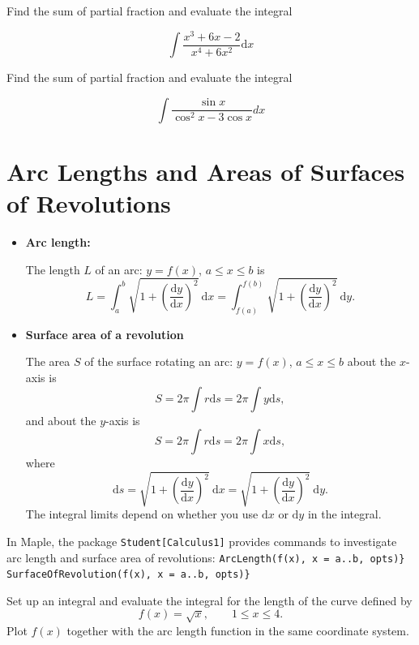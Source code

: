 \documentclass[]{book}
\theoremstyle{definition}
\theoremstyle{definition}
\theoremstyle{definition}
\theoremstyle{remark}
\let\BeginKnitrBlock\begin \let\EndKnitrBlock\end
\begin{document}
\BeginKnitrBlock{exercise}
\protect\hypertarget{exr:unnamed-chunk-5}{}{\label{exr:unnamed-chunk-5} }
Find the sum of partial fraction and evaluate the integral

\[
\int \frac{x^{3}+6 x-2}{x^{4}+6 x^{2}} \mathrm{d} x
\]
\EndKnitrBlock{exercise}

\BeginKnitrBlock{exercise}
\protect\hypertarget{exr:unnamed-chunk-6}{}{\label{exr:unnamed-chunk-6} }
Find the sum of partial fraction and evaluate the integral

\[
\int \frac{\sin x}{\cos ^{2} x-3 \cos x} d x
\]
\EndKnitrBlock{exercise}

\hypertarget{arc-lengths-and-areas-of-surfaces-of-revolutions}{%
\chapter{Arc Lengths and Areas of Surfaces of Revolutions}\label{arc-lengths-and-areas-of-surfaces-of-revolutions}}

\begin{itemize}
\item
  \textbf{Arc length:}

  The length \(L\) of an arc: \(y=f(x)\), \(a\leq x \leq b\) is
  \[
  L=\int_a^b\sqrt{1+\left(\frac{\mathrm{d} y}{\mathrm{d} x}\right)^2}~\mathrm{d} x=\int_{f(a)}^{f(b)}\sqrt{1+\left(\frac{\mathrm{d} y}{\mathrm{d} x}\right)^2}~\mathrm{d} y.
  \]
\item
  \textbf{Surface area of a revolution}

  The area \(S\) of the surface rotating an arc: \(y=f(x)\), \(a\leq x \leq b\) about the \(x\)-axis is
  \[
  S=2\pi\int r\mathrm{d} s = 2\pi\int y\mathrm{d} s,
  \]
  and about the \(y\)-axis is
  \[
  S=2\pi\int r\mathrm{d} s = 2\pi\int x\mathrm{d} s,
  \]
  where
  \[\mathrm{d} s=\sqrt{1+\left(\frac{\mathrm{d} y}{\mathrm{d} x}\right)^2}~\mathrm{d} x = \sqrt{1+\left(\frac{\mathrm{d} y}{\mathrm{d} x}\right)^2}~\mathrm{d} y.
  \]
  The integral limits depend on whether you use \(\mathrm{d} x\) or \(\mathrm{d}y\) in the integral.
\end{itemize}

In Maple, the package \texttt{Student{[}Calculus1{]}} provides commands to investigate arc length and surface area of revolutions:
\texttt{ArcLength(f(x),\ x\ =\ a..b,\ opts)\}}
\texttt{SurfaceOfRevolution(f(x),\ x\ =\ a..b,\ opts)\}}

\BeginKnitrBlock{example}
\protect\hypertarget{exm:unnamed-chunk-1}{}{\label{exm:unnamed-chunk-1} }
Set up an integral and evaluate the integral for the length of the curve defined by
\[
f(x)=\sqrt{x},\qquad 1\leq x\leq 4.
\]
Plot \(f(x)\) together with the arc length function in the same coordinate system.
\EndKnitrBlock{example}
\end{document}

